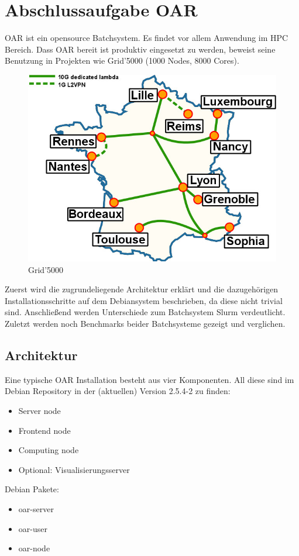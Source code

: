 \chapter{Abschlussaufgabe OAR}
OAR ist ein opensource Batchsystem. Es findet vor allem Anwendung im HPC Bereich.
Dass OAR bereit ist produktiv eingesetzt zu werden, beweist seine Benutzung in Projekten wie Grid'5000 (1000 Nodes, 8000 Cores).
\begin{figure}[H]
	\centering
	\includegraphics[scale=1.5]{grid5000.jpg} 
	\vspace{-10pt}
	\caption{Grid'5000}
\end{figure}
Zuerst wird die zugrundeliegende Architektur erklärt und die dazugehörigen Installationsschritte auf dem Debiansystem beschrieben,
da diese nicht trivial sind.
Anschließend werden Unterschiede zum Batchsystem Slurm verdeutlicht.
Zuletzt werden noch Benchmarks beider Batchsysteme gezeigt und verglichen.\pagebreak
\section{Architektur}
Eine typische OAR Installation besteht aus vier Komponenten. All diese sind im Debian Repository in der (aktuellen) Version 2.5.4-2 
zu finden:
    \begin{itemize}
        \item{Server node}
        \item{Frontend node}
        \item{Computing node}
        \item{Optional: Visualisierungsserver}
    \end{itemize}
    Debian Pakete:
    \begin{itemize}
        \item{oar-server}
        \item{oar-user}
        \item{oar-node}
    \end{itemize}

